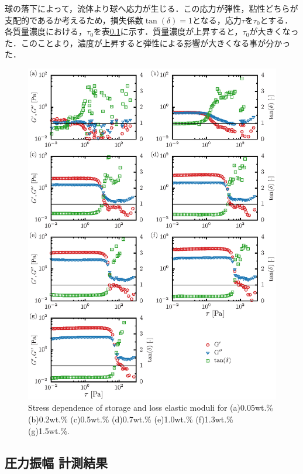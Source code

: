 球の落下によって，流体より球へ応力が生じる．この応力が弾性，粘性どちらが支配的であるか考えるため，損失係数$\tan(\delta)=1$となる，応力$\tau$を$\tau_0$とする．各質量濃度における，$\tau_0$を表\ref{}に示す．質量濃度が上昇すると，$\tau_0$が大きくなった．このことより，濃度が上昇すると弾性による影響が大きくなる事が分かった．

\begin{figure}[ht]
	\centering
	\includegraphics[clip]{4-Results/elastic_modulus.eps}
	\caption{Stress dependence of storage and loss elastic moduli for (a)0.05wt.\% (b)0.2wt.\% (c)0.5wt.\% (d)0.7wt.\% (e)1.0wt.\% (f)1.3wt.\% (g)1.5wt.\%.}
	\label{fig:PAA-elast}
\end{figure}

\newpage

\subsection{圧力振幅 計測結果}

